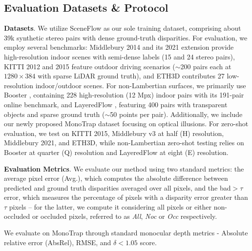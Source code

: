 \documentclass[10pt,twocolumn,letterpaper]{article}
\newcommand{\dataset}[0]{MonoTrap\xspace}
\begin{document}
\phantom{Invisible Text}
\vspace{-\baselineskip}

\subsection{Evaluation Datasets \& Protocol}


\textbf{Datasets}. We utilize SceneFlow \cite{mayer2016large} as our sole training dataset, comprising about 39k synthetic stereo pairs with dense ground-truth disparities. For evaluation, we employ several benchmarks: Middlebury 2014 \cite{scharstein2014high} and its 2021 extension \cite{middlebury2021} provide high-resolution indoor scenes with semi-dense labels (15 and 24 stereo pairs), KITTI 2012 \cite{geiger2012we} and 2015 \cite{menze2015object} feature outdoor driving scenarios ($\sim$200 pairs each at $1280 \times 384$ with sparse LiDAR ground truth), and ETH3D \cite{schops2017multi} contributes 27 low-resolution indoor/outdoor scenes. For non-Lambertian surfaces, we primarily use Booster \cite{zamaramirez2022booster}, containing 228 high-resolution (12 Mpx) indoor pairs with its 191-pair online benchmark, and LayeredFlow \cite{wen2024layeredflow}, featuring 400 pairs with transparent objects and sparse ground truth ($\sim$50 points per pair). Additionally, we include our newly proposed MonoTrap dataset focusing on optical illusions. For zero-shot evaluation, we test on KITTI 2015, Middlebury v3 at half (H) resolution, Middlebury 2021, and ETH3D, while non-Lambertian zero-shot testing relies on Booster at quarter (Q) resolution and LayeredFlow at eight (E) resolution.

\textbf{Evaluation Metrics}. We evaluate our method using two standard metrics: the average pixel error (Avg.), which computes the absolute difference between predicted and ground truth disparities averaged over all pixels, and the bad$>\tau$ error, which measures the percentage of pixels with a disparity error greater than $\tau$ pixels -- for the latter, we compute it considering all pixels or either non-occluded or occluded pixels, referred to as \textit{All}, \textit{Noc} or \textit{Occ} respectively.

We evaluate on \dataset through standard monocular depth metrics \cite{godard2017unsupervised} - Absolute relative error (AbsRel), RMSE, and $\delta<1.05$ score.
\end{document}
